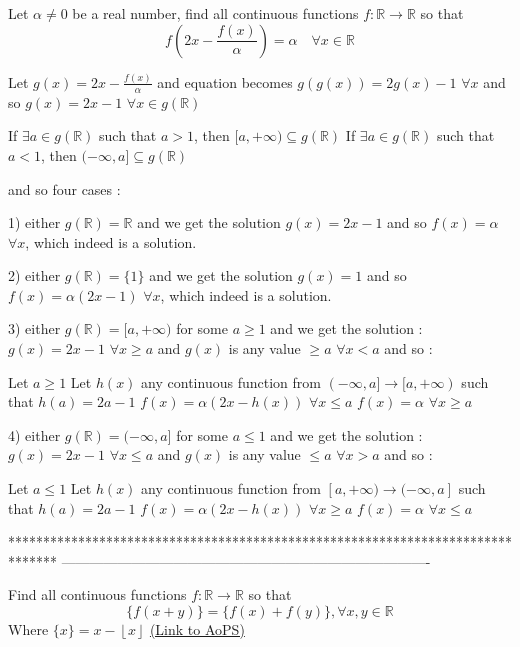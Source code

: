 \begin{solution}
	\begin{tcolorbox}Let $\alpha\neq 0$ be a real number, find all  continuous functions $f:\mathbb{R}\to\mathbb{R}$ so that \[f(2x-\frac{f(x)}{\alpha})=\alpha \quad \forall x\in\mathbb{R}\]\end{tcolorbox}
Let $g(x)=2x-\frac{f(x)}{\alpha}$ and equation becomes $g(g(x))=2g(x)-1$ $\forall x$ and so $g(x)=2x-1$ $\forall x\in g(\mathbb R)$

If $\exists a\in g(\mathbb R)$ such that $a>1$, then $[a,+\infty)\subseteq g(\mathbb R)$
If $\exists a\in g(\mathbb R)$ such that $a<1$, then $(-\infty,a]\subseteq g(\mathbb R)$

and so four cases :

1) either $g(\mathbb R)=\mathbb R$ and we get the solution $g(x)=2x-1$ and so $\boxed{f(x)=\alpha}$ $\forall x$, which indeed is a solution.

2) either $g(\mathbb R)=\{1\}$ and we get the solution $g(x)=1$ and so $\boxed{f(x)=\alpha(2x-1)}$ $\forall x$, which indeed is a solution.

3) either $g(\mathbb R)=[a,+\infty)$ for some $a\ge 1$ and we get the solution :
$g(x)=2x-1$ $\forall x\ge a$ and $g(x)$ is any value $\ge a$ $\forall x<a$ and so :

Let $a\ge 1$
Let $h(x)$ any continuous function from $(-\infty,a]\to [a,+\infty)$ such that $h(a)=2a-1$
$f(x)=\alpha(2x-h(x))$ $\forall x\le a$
$f(x)=\alpha$ $\forall x\ge a$

4) either $g(\mathbb R)=(-\infty,a]$ for some $a\le 1$ and we get the solution :
$g(x)=2x-1$ $\forall x\le a$ and $g(x)$ is any value $\le a$ $\forall x>a$ and so :

Let $a\le 1$
Let $h(x)$ any continuous function from $[a,+\infty)\to (-\infty,a]$ such that $h(a)=2a-1$
$f(x)=\alpha(2x-h(x))$ $\forall x\ge a$
$f(x)=\alpha$ $\forall x\le a$
\end{solution}
*******************************************************************************
-------------------------------------------------------------------------------

\begin{problem}
	Find all  continuous functions $f:\mathbb{R}\to\mathbb{R}$ so that \[\{f(x+y)\}=\{f(x)+f(y)\},\forall x,y\in\mathbb{R}\]
Where  $\{x\}=x-\left \lfloor x \right \rfloor $
	\flushright \href{https://artofproblemsolving.com/community/c6h594152}{(Link to AoPS)}
\end{problem}




